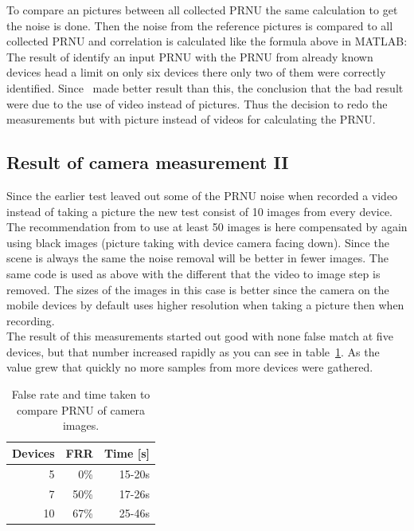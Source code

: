 To compare an pictures between all collected PRNU the same calculation to get the noise is done. Then the noise from the reference pictures is compared to all collected PRNU and correlation is calculated like the formula above in MATLAB:\\


The result of identify an input PRNU with the PRNU from already known devices head a limit on only six devices there only two of them were correctly identified. Since~\cite{sensor:camera:DCIdent} made better result than this, the conclusion that the bad result were due to the use of video instead of pictures. Thus the decision to redo the measurements but with picture instead of videos for calculating the PRNU. 

\subsection{Result of camera measurement II}
Since the earlier test leaved out some of the PRNU noise when recorded a video instead of taking a picture the new test consist of 10 images from every device. The recommendation from \cite{sensor:camera:DCIdent} to use at least 50 images is here compensated by again using black images (picture taking with device camera facing down). Since the scene is always the same the noise removal will be better in fewer images. The same code is used as above with the different that the video to image step is removed. The sizes of the images in this case is better since the camera on the mobile devices by default uses higher resolution when taking a picture then when recording. \\
The result of this measurements started out good with none false match at five devices, but that number increased rapidly as you can see in table~\ref{tab:falseCam}. As the value grew that quickly no more samples from more devices were gathered.

\begin{table}[htbp]
  \centering
    \begin{tabular}{rrr}
    \toprule
    Devices & FRR & Time [s] \\
    \midrule
    5     & 0\%   & 15-20s \\
    7     & 50\%  & 17-26s \\
    10    & 67\%  & 25-46s \\
    \bottomrule
    \end{tabular}%
    \caption{False rate and time taken to compare PRNU of camera images.}
  \label{tab:falseCam}%
\end{table}%


